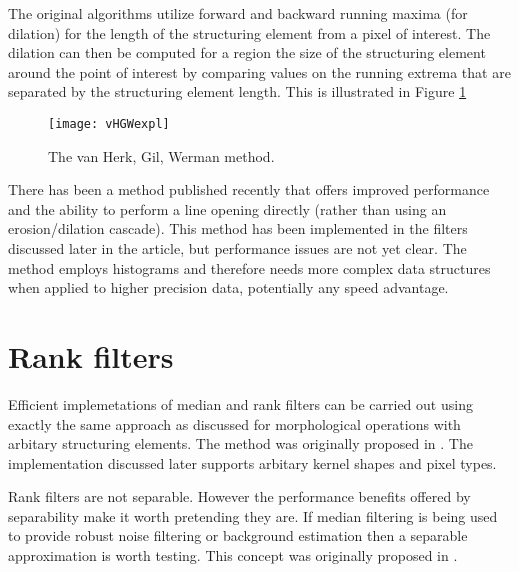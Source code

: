 \documentclass{InsightArticle}
\begin{document}
The original algorithms utilize forward and backward running maxima
(for dilation) for the length of the structuring element from a pixel
of interest. The dilation can then be computed for a region the size
of the structuring element around the point of interest by comparing
values on the running extrema that are separated by the structuring
element length. This is illustrated in Figure \ref{fig:vHGWmethod}

\begin{figure}[htbp]
\centering
\texttt{[image: vHGWexpl]}
\caption{The van Herk, Gil, Werman method.\label{fig:vHGWmethod}}
\end{figure}

There has been a method published recently that offers improved
performance \cite{Vandroogenbroeck2005Morphological} and the ability
to perform a line opening directly (rather than using an
erosion/dilation cascade). This method has been implemented in the
filters discussed later in the article, but performance issues are not
yet clear. The method employs histograms and therefore needs more
complex data structures when applied to higher precision data,
potentially any speed advantage.

\section{Rank filters}
Efficient implemetations of median and rank filters can be carried out
using exactly the same approach as discussed for morphological
operations with arbitary structuring elements. The method was
originally proposed in \cite{Huang79}. The implementation discussed
later supports arbitary kernel shapes and pixel types.

Rank filters are not separable. However the performance benefits
offered by separability make it worth pretending they are. If median
filtering is being used to provide robust noise filtering or
background estimation then a separable approximation is worth
testing. This concept was originally proposed in \cite{Narendra81}.

\appendix





\nocite{ITKSoftwareGuide}
\end{document}
